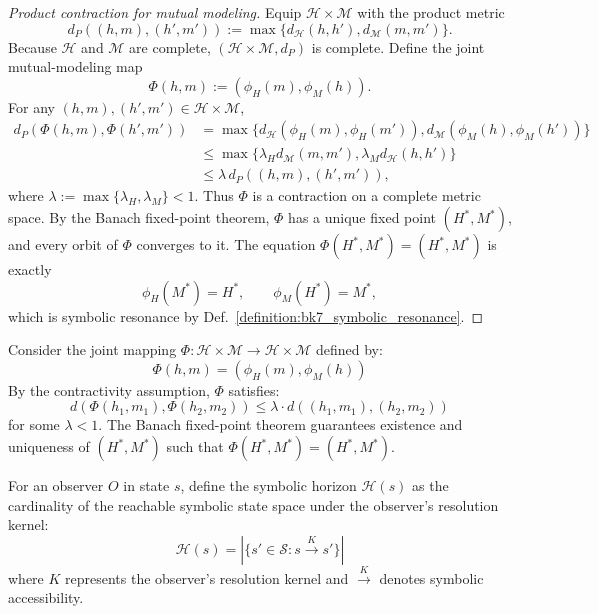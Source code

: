 \begin{proof}[Product contraction for mutual modeling]
\label{proof:bk7_two_way_street_fixed_point}
\leavevmode
Equip $\mathcal{H}\times\mathcal{M}$ with the product metric
\[
d_P((h,m),(h',m')):=\max\{d_{\mathcal{H}}(h,h'),d_{\mathcal{M}}(m,m')\}.
\]
Because $\mathcal{H}$ and $\mathcal{M}$ are complete, $(\mathcal{H}\times\mathcal{M},d_P)$ is complete. Define the joint mutual-modeling map
\[
\Phi(h,m):=(\phi_H(m),\phi_M(h)).
\]
For any $(h,m),(h',m')\in\mathcal{H}\times\mathcal{M}$,
\begin{align*}
d_P(\Phi(h,m),\Phi(h',m'))
&=\max\{d_{\mathcal{H}}(\phi_H(m),\phi_H(m')),
        d_{\mathcal{M}}(\phi_M(h),\phi_M(h'))\}\\
&\leq \max\{\lambda_H d_{\mathcal{M}}(m,m'),
             \lambda_M d_{\mathcal{H}}(h,h')\}\\
&\leq \lambda\, d_P((h,m),(h',m')),
\end{align*}
where $\lambda:=\max\{\lambda_H,\lambda_M\}<1$. Thus $\Phi$ is a contraction on a complete metric space. By the Banach fixed-point theorem, $\Phi$ has a unique fixed point $(H^*,M^*)$, and every orbit of $\Phi$ converges to it. The equation $\Phi(H^*,M^*)=(H^*,M^*)$ is exactly
\[
\phi_H(M^*)=H^*,
\qquad
\phi_M(H^*)=M^*,
\]
which is symbolic resonance by Def.~\ref{definition:bk7_symbolic_resonance}.
\end{proof}

\begin{demonstratio}
\label{demonstratio:bk7_two_way_street_fixed_point}
Consider the joint mapping $\Phi: \mathcal{H} \times \mathcal{M} \to \mathcal{H} \times \mathcal{M}$ defined by:
$$\Phi(h, m) = (\phi_H(m), \phi_M(h))$$
By the contractivity assumption, $\Phi$ satisfies:
$$d(\Phi(h_1, m_1), \Phi(h_2, m_2)) \leq \lambda \cdot d((h_1, m_1), (h_2, m_2))$$
for some $\lambda < 1$. The Banach fixed-point theorem guarantees existence and uniqueness of $(H^*, M^*)$ such that $\Phi(H^*, M^*) = (H^*, M^*)$.
\end{demonstratio}

\begin{definition}
\label{definition:bk7_symbolic_horizon}
For an observer $O$ in state $s$, define the symbolic horizon $\mathcal{H}(s)$ as the cardinality of the reachable symbolic state space under the observer's resolution kernel:
$$\mathcal{H}(s) = |\{s' \in \mathcal{S} : s \xrightarrow{K} s'\}|$$
where $K$ represents the observer's resolution kernel and $\xrightarrow{K}$ denotes symbolic accessibility.
\end{definition}

